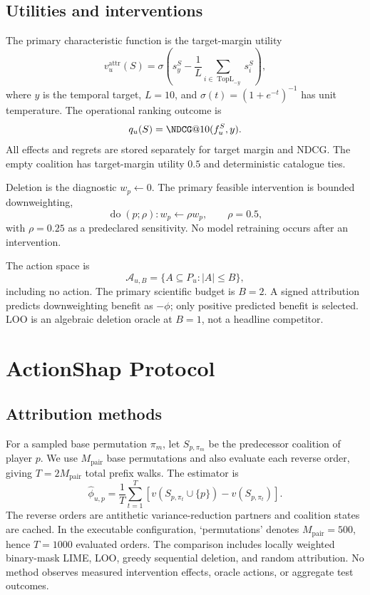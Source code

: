 \documentclass[pdflatex,sn-basic,Numbered]{sn-jnl}
\theoremstyle{thmstyleone}
\theoremstyle{thmstyletwo}
\theoremstyle{thmstylethree}
\begin{document}
\subsection{Utilities and interventions}
The primary characteristic function is the target-margin utility
\begin{equation}
v_u^{\mathrm{attr}}(S)=\sigma\left(s_y^S-\frac{1}{L}\sum_{i\in\operatorname{TopL}_{-y}}s_i^S\right),
\end{equation}
where $y$ is the temporal target, $L=10$, and $\sigma(t)=(1+e^{-t})^{-1}$ has unit temperature. The operational ranking outcome is
\begin{equation}
q_u(S)=\NDCG@10(f_u^S,y).
\end{equation}
All effects and regrets are stored separately for target margin and NDCG. The empty coalition has target-margin utility $0.5$ and deterministic catalogue ties.

Deletion is the diagnostic $w_p\leftarrow0$. The primary feasible intervention is bounded downweighting,
\begin{equation}
\operatorname{do}(p;\rho):w_p\leftarrow\rho w_p,\qquad \rho=0.5,
\end{equation}
with $\rho=0.25$ as a predeclared sensitivity. No model retraining occurs after an intervention.

The action space is
\begin{equation}
\mathcal A_{u,B}=\{A\subseteq P_u:|A|\le B\},
\end{equation}
including no action. The primary scientific budget is $B=2$. A signed attribution predicts downweighting benefit as $-\phi$; only positive predicted benefit is selected. LOO is an algebraic deletion oracle at $B=1$, not a headline competitor.

\section{ActionShap Protocol}
\subsection{Attribution methods}
For a sampled base permutation $\pi_m$, let $S_{p,\pi_m}$ be the predecessor coalition of player $p$. We use $M_{\mathrm{pair}}$ base permutations and also evaluate each reverse order, giving $T=2M_{\mathrm{pair}}$ total prefix walks. The estimator is
\begin{equation}
\widehat\phi_{u,p}=\frac{1}{T}\sum_{t=1}^{T}\left[v(S_{p,\pi_t}\cup\{p\})-v(S_{p,\pi_t})\right].
\end{equation}
The reverse orders are antithetic variance-reduction partners and coalition states are cached. In the executable configuration, `permutations' denotes $M_{\mathrm{pair}}=500$, hence $T=1000$ evaluated orders. The comparison includes locally weighted binary-mask LIME, LOO, greedy sequential deletion, and random attribution. No method observes measured intervention effects, oracle actions, or aggregate test outcomes.
\end{document}
